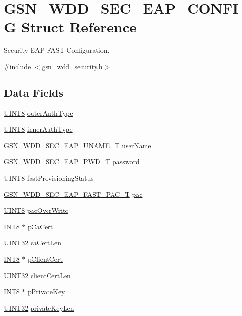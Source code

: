 \hypertarget{a00287}{
\section{GSN\_\-WDD\_\-SEC\_\-EAP\_\-CONFIG Struct Reference}
\label{a00287}
}


Security EAP FAST Configuration.  




{\ttfamily \#include $<$gsn\_\-wdd\_\-security.h$>$}

\subsection*{Data Fields}
\begin{DoxyCompactItemize}
\item 
\hyperlink{a00660_gab27e9918b538ce9d8ca692479b375b6a}{UINT8} \hyperlink{a00287_aca123f367880097bb8f76684b96e0405}{outerAuthType}
\item 
\hyperlink{a00660_gab27e9918b538ce9d8ca692479b375b6a}{UINT8} \hyperlink{a00287_a415b53bfa48ff973198d3da906077858}{innerAuthType}
\item 
\hyperlink{a00290}{GSN\_\-WDD\_\-SEC\_\-EAP\_\-UNAME\_\-T} \hyperlink{a00287_ab1d98f2c44a108ee6359de8e3b3dd140}{userName}
\item 
\hyperlink{a00289}{GSN\_\-WDD\_\-SEC\_\-EAP\_\-PWD\_\-T} \hyperlink{a00287_a20cc3a5a97bc72ad6de7248fd09c5039}{password}
\item 
\hyperlink{a00660_gab27e9918b538ce9d8ca692479b375b6a}{UINT8} \hyperlink{a00287_a4dc9193a014ae4c6113a2e44bc50c9a6}{fastProvisioningStatus}
\item 
\hyperlink{a00288}{GSN\_\-WDD\_\-SEC\_\-EAP\_\-FAST\_\-PAC\_\-T} \hyperlink{a00287_a33c4dc19eab43caa7d0e1c94cb079af8}{pac}
\item 
\hyperlink{a00660_gab27e9918b538ce9d8ca692479b375b6a}{UINT8} \hyperlink{a00287_ad688cc5df70aa8543118438c08e7c978}{pacOverWrite}
\item 
\hyperlink{a00660_ga307b8734c020247f6bac4fcde0dcfbb9}{INT8} $\ast$ \hyperlink{a00287_aff3b0f6452ae07dafee494da7db35edd}{pCaCert}
\item 
\hyperlink{a00660_gae1e6edbbc26d6fbc71a90190d0266018}{UINT32} \hyperlink{a00287_a91a9fb29070a3ee80937f9e601dc2335}{caCertLen}
\item 
\hyperlink{a00660_ga307b8734c020247f6bac4fcde0dcfbb9}{INT8} $\ast$ \hyperlink{a00287_a5415c8104a892ba1beba657f6fc5005f}{pClientCert}
\item 
\hyperlink{a00660_gae1e6edbbc26d6fbc71a90190d0266018}{UINT32} \hyperlink{a00287_ac5992c4484c851247e76e7a2dc9af875}{clientCertLen}
\item 
\hyperlink{a00660_ga307b8734c020247f6bac4fcde0dcfbb9}{INT8} $\ast$ \hyperlink{a00287_a767185f45115923ca73705657883a7b8}{pPrivateKey}
\item 
\hyperlink{a00660_gae1e6edbbc26d6fbc71a90190d0266018}{UINT32} \hyperlink{a00287_a17491f8d62936a04e441ef96177f42f4}{privateKeyLen}
\end{DoxyCompactItemize}


